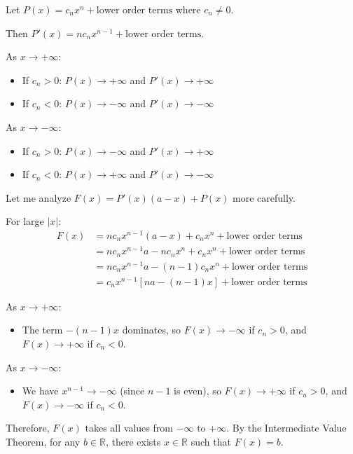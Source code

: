 \documentclass[12pt,a4paper]{article}
\theoremstyle{definition}
\begin{document}
    Let $P(x) = c_nx^n + \text{lower order terms}$ where $c_n \neq 0$.

    Then $P'(x) = nc_nx^{n-1} + \text{lower order terms}$.

    As $x \to +\infty$:
    \begin{itemize}
        \item If $c_n > 0$: $P(x) \to +\infty$ and $P'(x) \to +\infty$
        \item If $c_n < 0$: $P(x) \to -\infty$ and $P'(x) \to -\infty$
    \end{itemize}

    As $x \to -\infty$:
    \begin{itemize}
        \item If $c_n > 0$: $P(x) \to -\infty$ and $P'(x) \to +\infty$
        \item If $c_n < 0$: $P(x) \to +\infty$ and $P'(x) \to -\infty$
    \end{itemize}

    Let me analyze $F(x) = P'(x)(a - x) + P(x)$ more carefully.

    For large $|x|$:
    \begin{align}
        F(x) &= nc_nx^{n-1}(a - x) + c_nx^n + \text{lower order terms}\\
        &= nc_nx^{n-1}a - nc_nx^n + c_nx^n + \text{lower order terms}\\
        &= nc_nx^{n-1}a - (n-1)c_nx^n + \text{lower order terms}\\
        &= c_nx^{n-1}[na - (n-1)x] + \text{lower order terms}
    \end{align}

    As $x \to +\infty$:
    \begin{itemize}
        \item The term $-(n-1)x$ dominates, so $F(x) \to -\infty$ if $c_n > 0$, and $F(x) \to +\infty$ if $c_n < 0$.
    \end{itemize}

    As $x \to -\infty$:
    \begin{itemize}
        \item We have $x^{n-1} \to -\infty$ (since $n-1$ is even), so $F(x) \to +\infty$ if $c_n > 0$, and $F(x) \to -\infty$ if $c_n < 0$.
    \end{itemize}

    Therefore, $F(x)$ takes all values from $-\infty$ to $+\infty$. By the Intermediate Value Theorem, for any $b \in \mathbb{R}$, there exists $x \in \mathbb{R}$ such that $F(x) = b$.
\end{document}
